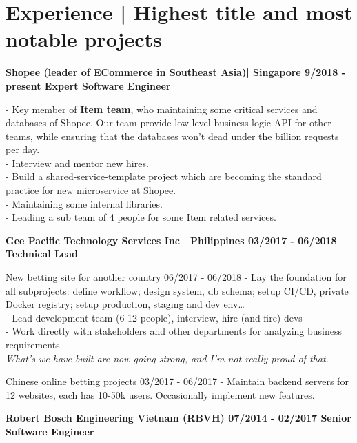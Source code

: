 \section*{Experience | \small{Highest title and most notable projects}}
{%
    \textbf{\event
      {Shopee (leader of ECommerce in Southeast Asia)| Singapore}
      {9/2018 - present}
      {Expert Software Engineer}
    }

  {
    - Key member of \textbf{Item team}, who maintaining some critical services
    and databases of Shopee. Our team provide low level business logic API for
    other teams, while ensuring that the databases won't dead under the billion
    requests per day. \\
    - Interview and mentor new hires. \\
    - Build a shared-service-template project which are becoming the standard \\
    practice for new microservice at Shopee. \\
    - Maintaining some internal libraries. \\
    - Leading a sub team of 4 people for some Item related services.
  }
  \break

  \textbf{\event
    {Gee Pacific Technology Services Inc | Philippines}
    {03/2017 - 06/2018}
    {Technical Lead}
  }

  \event
  {New betting site for another country}
  {06/2017 - 06/2018}
  {
    - Lay the foundation for all subprojects: define workflow; design system,
    db schema; setup CI/CD, private Docker registry; setup production, staging and
      dev env\dots
      \\
    - Lead development team (6-12 people), interview, hire (and fire) devs
      \\
    - Work directly with stakeholders and other departments for analyzing
      business requirements \\
    \textit{What's we have built are now going strong, and I'm not really proud of that.}
  }

  \event
  {Chinese online betting projects}
  {03/2017 - 06/2017}
  {
    - Maintain backend servers for 12 websites, each has 10-50k users. Occasionally implement new features.
  }

  \textbf{\event
    {Robert Bosch Engineering Vietnam (RBVH)}
    {07/2014 - 02/2017}
    {Senior Software Engineer}
  }

}
